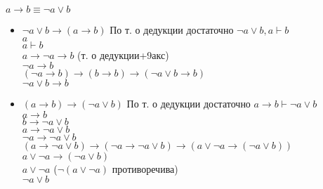 $a\to b\equiv\neg a\vee b$
\begin{itemize}
	\item $\neg a\vee b\to (a\to b)$
	По т. о дедукции достаточно $\neg a\vee b, a\vdash b$\\
	$a$\\
	$a\vdash b$\\
	$a\to\neg a\to b$ (т. о дедукции+9акс)\\
	$\neg a\to b$\\
	$(\neg a\to b)\to(b\to b)\to(\neg a\vee b\to b)$\\
	$\neg a\vee b\to b$
	\item $(a\to b)\to(\neg a\vee b)$
	По т. о дедукции достаточно $a\to b\vdash \neg a\vee b$\\
	$a\to b$\\
	$b\to \neg a\vee b$\\
	$a\to\neg a\vee b$\\
	$\neg a\to\neg a\vee b$\\
	$(a\to\neg a\vee b)\to(\neg a\to\neg a\vee b)\to(a\vee\neg a\to (\neg a\vee b))$\\
	$a\vee\neg a\to (\neg a\vee b)$\\
	$a\vee\neg a$ ($\neg(a\vee\neg a)$ противоречива)\\
	$\neg a\vee b$
\end{itemize}

\bigskip

